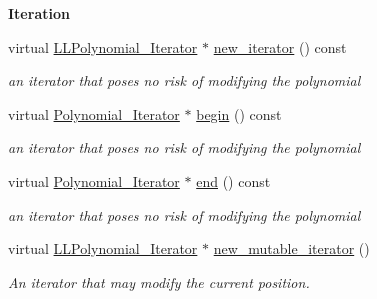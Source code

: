 \begin{Indent}\textbf{ Iteration}\par
\begin{DoxyCompactItemize}
\item 
\mbox{\label{class_polynomial___linked___list_ab9d45b6be97cb4fd296a1ed193061e7b}} 
virtual \hyperlink{class_l_l_polynomial___iterator}{L\+L\+Polynomial\+\_\+\+Iterator} $\ast$ \hyperlink{class_polynomial___linked___list_ab9d45b6be97cb4fd296a1ed193061e7b}{new\+\_\+iterator} () const
\begin{DoxyCompactList}\small\item\em an iterator that poses no risk of modifying the polynomial \end{DoxyCompactList}\item 
\mbox{\label{class_polynomial___linked___list_a395cd397450eee1c1ec818b5936c6ec4}} 
virtual \hyperlink{class_polynomial___iterator}{Polynomial\+\_\+\+Iterator} $\ast$ \hyperlink{class_polynomial___linked___list_a395cd397450eee1c1ec818b5936c6ec4}{begin} () const
\begin{DoxyCompactList}\small\item\em an iterator that poses no risk of modifying the polynomial \end{DoxyCompactList}\item 
\mbox{\label{class_polynomial___linked___list_a3a895a7655068601c241acef88fde546}} 
virtual \hyperlink{class_polynomial___iterator}{Polynomial\+\_\+\+Iterator} $\ast$ \hyperlink{class_polynomial___linked___list_a3a895a7655068601c241acef88fde546}{end} () const
\begin{DoxyCompactList}\small\item\em an iterator that poses no risk of modifying the polynomial \end{DoxyCompactList}\item 
\mbox{\label{class_polynomial___linked___list_ab13e7f4bb223c53adddbc9110d791411}} 
virtual \hyperlink{class_l_l_polynomial___iterator}{L\+L\+Polynomial\+\_\+\+Iterator} $\ast$ \hyperlink{class_polynomial___linked___list_ab13e7f4bb223c53adddbc9110d791411}{new\+\_\+mutable\+\_\+iterator} ()
\begin{DoxyCompactList}\small\item\em An iterator that may modify the current position. \end{DoxyCompactList}\end{DoxyCompactItemize}
\end{Indent}
